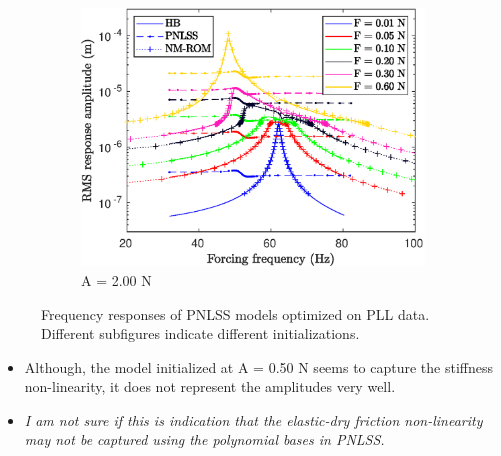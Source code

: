 \documentclass[aspectratio=169]{beamer}
\begin{document}
\begin{frame}[allowframebreaks]
\begin{figure}[!h]
\begin{subfigure}[!h]{0.2\linewidth}
      \includegraphics[width=\linewidth]{../../benchmark4/extabs_fig/b4_fresp_comp_pll_famp20_nx23}
      \caption{A = 2.00 N}
    \end{subfigure}%
    \caption{Frequency responses of PNLSS models optimized on PLL
      data. Different subfigures indicate different initializations.}
  \end{figure}
  \vspace{-0.8cm}
  \begin{itemize}
  \item Although, the model initialized at A = 0.50 N seems to capture
    the stiffness non-linearity, it does not represent the amplitudes
    very well.
  \item \textit{I am not sure if this is indication that the elastic-dry
    friction non-linearity may not be captured using the polynomial
    bases in PNLSS.}
  \end{itemize}
\end{frame}
\end{document}
